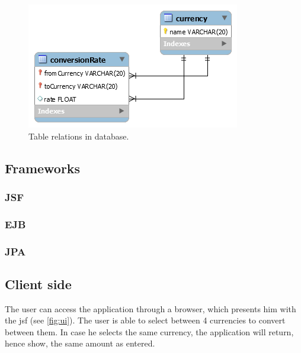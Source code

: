 \documentclass[a4paper]{scrartcl}
\begin{document}
\begin{figure}[h!]
  \begin{center}
    \includegraphics[scale=0.8]{db.png}
    \caption{Table relations in database.}
    \label{fig:database}
  \end{center}
\end{figure}



\subsection{Frameworks}

\subsubsection{JSF}


\subsubsection{EJB}



\subsubsection{JPA}



\subsection{}


\subsection{Client side}
The user can access the application through a browser, which presents him with the jsf (see \ref{fig:ui}).
The user is able to select between 4 currencies to convert between them.
In case he selects the same currency, the application will return, hence show, the same amount as entered.
\end{document}
